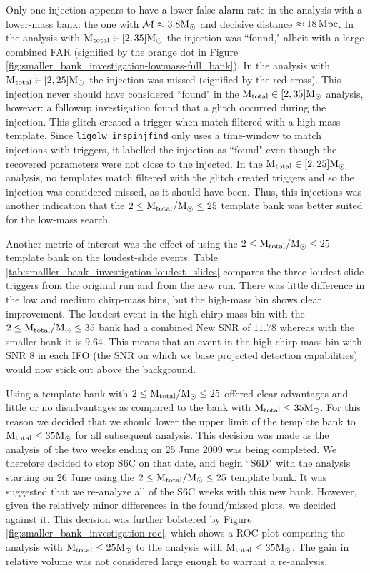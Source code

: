 Only one injection appears to have a lower false alarm rate in the analysis
with a lower-mass bank: the one with $\mathcal{M} \approx 3.8\mathrm{M_\odot}$ and decisive
distance $\approx 18\,\mathrm{Mpc}$. In the analysis with $\mathrm{M_{total}} \in [2,35]\mathrm{M_\odot}$ the
injection was ``found," albeit with a large combined \ac{FAR} (signified by the
orange dot in Figure \ref{fig:smaller_bank_investigation-lowmass-full_bank}).
In the analysis with $\mathrm{M_{total}} \in [2,25]\mathrm{M_\odot}$ the injection was missed
(signified by the red cross). This injection never should have considered
``found" in the $\mathrm{M_{total}} \in [2,35]\mathrm{M_\odot}$ analysis, however: a followup
investigation found that a glitch occurred during the injection. This glitch
created a trigger when match filtered with a high-mass template. Since
\texttt{ligolw\_inspinjfind} only uses a time-window to match injections with
triggers, it labelled the injection as ``found" even though the recovered
parameters were not close to the injected. In the $\mathrm{M_{total}} \in [2,25]\mathrm{M_\odot}$
analysis, no templates match filtered with the glitch created triggers and so
the injection was considered missed, as it should have been. Thus, this
injections was another indication that the $2 \leq \mathrm{M_{total}}/\mathrm{M_\odot} \leq 25$
template bank was better suited for the low-mass search.

Another metric of interest was the effect of using the $2 \leq \mathrm{M_{total}}/\mathrm{M_\odot}
\leq 25$ template bank on the loudest-slide events. Table
\ref{tab:smalller_bank_investigation-loudest_slides} compares the three
loudest-slide triggers from the original run and from the new run. There was
little difference in the low and medium chirp-mass bins, but the high-mass bin
shows clear improvement. The loudest event in the high chirp-mass bin with the
$2 \leq \mathrm{M_{total}}/\mathrm{M_\odot} \leq 35$ bank had a combined New \ac{SNR} of $11.78$
whereas with the smaller bank it is $9.64$. This means that an event in the
high chirp-mass bin with \ac{SNR} $8$ in each \ac{IFO} (the \ac{SNR} on which
we base projected detection capabilities) would now stick out above the
background.

Using a template bank with $2 \leq \mathrm{M_{total}}/\mathrm{M_\odot} \leq 25$ offered clear
advantages and little or no disadvantages as compared to the bank with $\mathrm{M_{total}}
\leq 35\mathrm{M_\odot}$. For this reason we decided that we should lower the upper limit
of the template bank to $\mathrm{M_{total}} \leq 35\mathrm{M_\odot}$ for all subsequent analysis.
This decision was made as the analysis of the two weeks ending on 25 June 2009
was being completed. We therefore decided to stop S6C on that date, and begin
``S6D" with the analysis starting on 26 June using the $2 \leq \mathrm{M_{total}}/\mathrm{M_\odot}
\leq 25$ template bank. It was suggested that we re-analyze all of the S6C
weeks with this new bank. However, given the relatively minor differences in
the found/missed plots, we decided against it. This decision was further
bolstered by Figure \ref{fig:smaller_bank_investigation-roc}, which shows a ROC
plot comparing the analysis with $\mathrm{M_{total}} \leq 25\mathrm{M_\odot}$ to the analysis with
$\mathrm{M_{total}} \leq 35\mathrm{M_\odot}$. The gain in relative volume was not considered large
enough to warrant a re-analysis.

